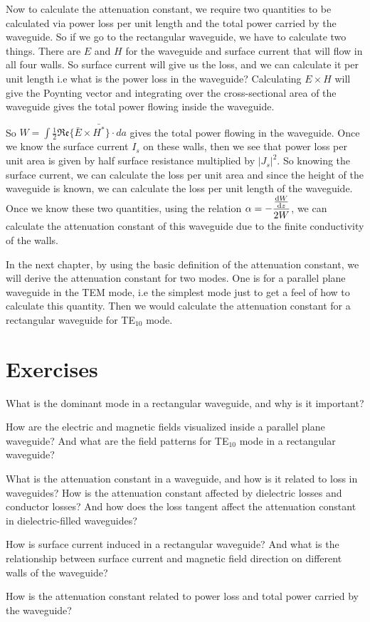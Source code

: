 Now to calculate the attenuation constant, we require two quantities to be calculated via power loss per unit length and the total power carried by the waveguide. So if we go to the rectangular waveguide, we have to calculate two things. There are $E$ and $H$ for the waveguide and surface current that will flow in all four walls. So surface current will give us the loss, and we can calculate it per unit length i.e what is the power loss in the waveguide? Calculating $E\times H$ will give the Poynting vector and integrating over the cross-sectional area of the waveguide gives the total power flowing inside the waveguide. 

So $W = \int\frac{1}{2}\mathfrak{Re}\{\bar{E}\times\bar{H^*}\}\cdot{da}$ gives the total power flowing in  the waveguide. Once we know the surface current $I_{s}$ on these walls, then we see that power loss per unit area is given by half surface resistance multiplied by $|J_{s}|^{2}$. So knowing the surface current, we can calculate the loss per unit area and since the height of the waveguide is known, we can calculate the loss per unit length of the waveguide. Once we know these two quantities, using the relation $\alpha = -\dfrac{\dv{W}{z}}{2W}$, we can calculate the attenuation constant of this waveguide due to the finite conductivity of the walls.

In the next chapter, by using the basic definition of the attenuation constant, we will derive the attenuation constant for two modes. One is for a parallel plane waveguide in the TEM mode, i.e the simplest mode just to get a feel of how to calculate this quantity. Then we would calculate the attenuation constant for a rectangular waveguide for TE$_{10}$ mode.

\section*{Exercises}
\begin{ExerciseList}
\Exercise[label={ex411}]
What is the dominant mode in a rectangular waveguide, and why is it important?

\Exercise[label={ex412}]
How are the electric and magnetic fields visualized inside a parallel plane waveguide? And what are the field patterns for TE$_{10}$ mode in a rectangular waveguide?

\Exercise[label={ex413}]
What is the attenuation constant in a waveguide, and how is it related to loss in waveguides? How is the attenuation constant affected by dielectric losses and conductor losses? And how does the loss tangent affect the attenuation constant in dielectric-filled waveguides?

\Exercise[label={ex414}]
How is surface current induced in a rectangular waveguide? And what is the relationship between surface current and magnetic field direction on different walls of the waveguide?

\Exercise[label={ex415}]
How is the attenuation constant related to power loss and total power carried by the waveguide?
\end{ExerciseList}
